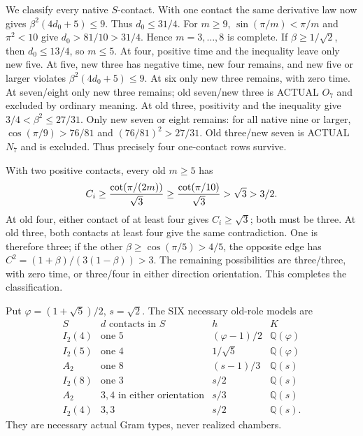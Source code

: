 We classify every native \(S\)-contact.
With one contact the same derivative law
now gives \(\beta^2(4d_0+5)\le9\).
Thus \(d_0\le31/4\).
For \(m\ge9\), \(\sin(\pi/m)<\pi/m\) and
\(\pi^2<10\) give \(d_0>81/10>31/4\).
Hence \(m=3,\ldots,8\) is complete.
If \(\beta\ge1/\sqrt2\), then
\(d_0\le13/4\), so \(m\le5\).
At four, positive time and the inequality
leave only new five.
At five, new three has negative time,
new four remains, and new five or larger
violates \(\beta^2(4d_0+5)\le9\).
At six only new three remains, with
zero time.
At seven/eight only new three remains;
old seven/new three is ACTUAL \(O_7\)
and excluded by ordinary meaning.
At old three, positivity and the inequality
give \(3/4<\beta^2\le27/31\).
Only new seven or eight remains:
for all native nine or larger,
\(\cos(\pi/9)>76/81\) and
\((76/81)^2>27/31\).
Old three/new seven is ACTUAL \(N_7\)
and is excluded.
Thus precisely four one-contact rows survive.

With two positive contacts, every old
\(m\ge5\) has
\[
                   C_i\ge{\cot(\pi/(2m))\over\sqrt3}
                       \ge{\cot(\pi/10)\over\sqrt3}
                       >\sqrt3>3/2 .
\]
At old four, either contact of at least
four gives \(C_i\ge\sqrt3\);
both must be three.
At old three, both contacts at least four
give the same contradiction.
One is therefore three; if the other
\(\beta\ge\cos(\pi/5)>4/5\), the opposite
edge has \(C^2=(1+\beta)/(3(1-\beta))>3\).
The remaining possibilities are three/three,
with zero time, or three/four in either
direction orientation.
This completes the classification.

Put \(\varphi=(1+\sqrt5)/2\), \(s=\sqrt2\).
The SIX necessary old-role models are
\[
 \begin{array}{c|c|c|c}
 S&d\text{ contacts in }S&h&K\\ \hline
 I_2(4)&\text{one }5&(\varphi-1)/2&\mathbb Q(\varphi)\\
 I_2(5)&\text{one }4&1/\sqrt5&\mathbb Q(\varphi)\\
 A_2&\text{one }8&(s-1)/3&\mathbb Q(s)\\
 I_2(8)&\text{one }3&s/2&\mathbb Q(s)\\
 A_2&3,4\text{ in either orientation}&s/3&\mathbb Q(s)\\
 I_2(4)&3,3&s/2&\mathbb Q(s).
 \end{array}
\tag{A14six}\label{eq:arithA14sixmodels}
\]
They are necessary actual Gram types,
never realized chambers.

